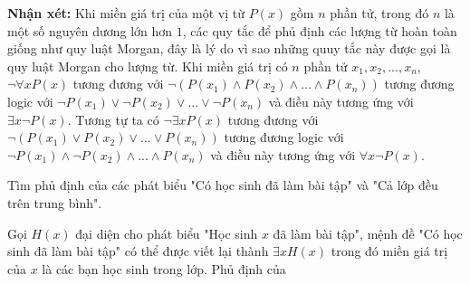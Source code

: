 \documentclass{standalone} %
\begin{document}
        \textbf{Nhận xét:} Khi miền giá trị của một vị từ $P(x)$ gồm $n$ phần tử, trong đó $n$ là một số nguyên dương lớn hơn $1$, các quy tắc để phủ định các lượng từ hoàn toàn giống như quy luật Morgan, đây là lý do vì sao những quuy tắc này được gọi là quy luật Morgan cho lượng từ. Khi miền giá trị có $n$ phần tử $x_1, x_2, ..., x_n$, $\neg \forall x P(x)$ tương đương với $\neg( P(x_1) \land P(x_2) \land ... \land P(x_n))$ tương đương logic với $\neg P(x_1) \lor \neg P(x_2) \lor ... \lor \neg P(x_n)$ và điều này tương ứng với $\exists x \neg P(x)$. Tương tự ta có $\neg \exists x P(x)$ tương đương với $\neg (P(x_1) \lor P(x_2) \lor ... \lor P(x_n))$ tương đương logic với $\neg P(x_1) \land \neg P(x_2) \land ... \land P(x_n)$ và điều này tương ứng với $\forall x \neg P(x)$.
        
        \begin{example}
            Tìm phủ định của các phát biểu "Có học sinh đã làm bài tập" và "Cả lớp đều trên trung bình".
        \end{example}
        
        Gọi $H(x)$ đại diện cho phát biểu "Học sinh $x$ đã làm bài tập", mệnh đề "Có học sinh đã làm bài tập" có thể được viết lại thành $\exists x H(x)$ trong đó miền giá trị của $x$ là các bạn học sinh trong lớp. Phủ định của 
        
\end{document}
